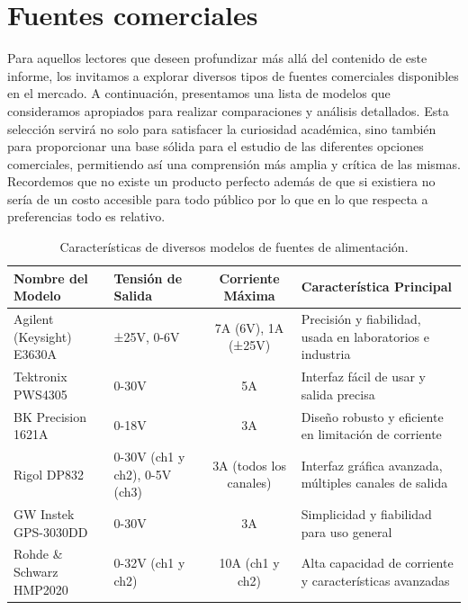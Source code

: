 \section{Fuentes comerciales}\par 
Para aquellos lectores que deseen profundizar más allá del contenido de este informe, los invitamos a explorar diversos tipos de fuentes comerciales disponibles en el mercado. A continuación, presentamos una lista de modelos que consideramos apropiados para realizar comparaciones y análisis detallados. Esta selección servirá no solo para satisfacer la curiosidad académica, sino también para proporcionar una base sólida para el estudio de las diferentes opciones comerciales, permitiendo así una comprensión más amplia y crítica de las mismas. Recordemos que no existe un producto perfecto además de que si existiera no sería de un costo accesible para todo público por lo que en lo que respecta a  preferencias todo es relativo. \par 
\begin{table}[h!]
    \centering
    \caption{Características de diversos modelos de fuentes de alimentación.}
    \label{tab:fuentes_alimentacion}
    \begin{tabular}{|p{3cm}|p{3cm}|c|p{5cm}|}
        \hline
        \textbf{Nombre del Modelo} & \textbf{Tensión de Salida} & \textbf{Corriente Máxima} & \textbf{Característica Principal} \\ \hline \hline
        Agilent (Keysight) E3630A & ±25V, 0-6V & 7A (6V), 1A (±25V) & Precisión y fiabilidad, usada en laboratorios e industria \\ \hline
        Tektronix PWS4305 & 0-30V & 5A & Interfaz fácil de usar y salida precisa \\ \hline
        BK Precision 1621A & 0-18V & 3A & Diseño robusto y eficiente en limitación de corriente \\ \hline
        Rigol DP832 & 0-30V (ch1 y ch2), 0-5V (ch3) & 3A (todos los canales) & Interfaz gráfica avanzada, múltiples canales de salida \\ \hline
        GW Instek GPS-3030DD & 0-30V & 3A & Simplicidad y fiabilidad para uso general \\ \hline
        Rohde \& Schwarz HMP2020 & 0-32V (ch1 y ch2) & 10A (ch1 y ch2) & Alta capacidad de corriente y características avanzadas \\ \hline
    \end{tabular}
\end{table}




